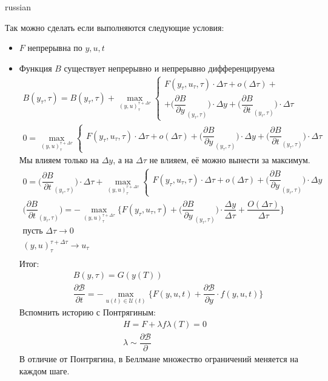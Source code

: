 \documentclass{article}
\begin{document}
\begin{otherlanguage*}{russian}
\begin{enumerate}
Так можно сделать если выполняются следующие условия:
\begin{itemize}
\item $ F $ непрерывна по $ y, u, t $  
\item Функция $ B $ существует непрерывно и непрерывно дифференцируема
\begin{align*}
B(y_\tau, \tau) = B(y_\tau, \tau) + \max_{(y, u)^{\tau + \Delta \tau}_{\tau}} \begin{cases} F(y_\tau, u_\tau, \tau) \cdot \Delta \tau + o(\Delta \tau) + \\ + \Big(\dfrac{\partial B}{\partial y}_{(y_\tau, \tau)}\Big) \cdot \Delta y + \Big(\dfrac{\partial B}{\partial t}_{(y_\tau, \tau)}\Big) \cdot \Delta \tau  \end{cases} \\
0 = \max_{(y, u)^{\tau + \Delta \tau}_{\tau}} \begin{cases} F(y_\tau, u_\tau, \tau) \cdot \Delta \tau + o(\Delta \tau) +  \Big(\dfrac{\partial B}{\partial y}_{(y_\tau, \tau)}\Big) \cdot \Delta y + \Big(\dfrac{\partial B}{\partial t}_{(y_\tau, \tau)}\Big) \cdot \Delta \tau  \end{cases}
\end{align*}
Мы влияем только на $ \Delta y$, а на $ \Delta \tau $ не влияем, её можно вынести за максимум. 
\begin{align*}
0 = \Big(\dfrac{\partial B}{\partial t}_{(y_\tau, \tau)}\Big) \cdot \Delta \tau + \max_{(y, u)^{\tau + \Delta \tau}_{\tau}} \begin{cases} F(y_\tau, u_\tau, \tau) \cdot \Delta \tau + o(\Delta \tau) +  \Big(\dfrac{\partial B}{\partial y}_{(y_\tau, \tau)}\Big) \cdot \Delta y \end{cases} \\
 \Big(\dfrac{\partial B}{\partial t}_{(y_\tau, \tau)}\Big) = - \max_{(y, u)^{\tau + \Delta \tau}_\tau} \{ F(y_\tau, u_\tau, \tau) + \Big(\dfrac{\partial B}{\partial y}_{(y_\tau, \tau)}\Big) \cdot \dfrac{\Delta y}{\Delta \tau}  + \dfrac{O(\Delta \tau)}{\Delta \tau} \} \\
\text{пусть } \Delta \tau \rightarrow 0 \\
(y, u)^{\tau + \Delta \tau}_\tau \rightarrow u_\tau \\
\end{align*}
Итог:
\begin{align*}
& B(y, \tau) = G(y(T)) \\
& \dfrac{\partial \mathcal{B}}{\partial t} = - \max_{u(t) \in \mathcal{U}(t)} \{ F(y, u, t) + \dfrac{\partial \mathcal{B}}{\partial y} \cdot f(y, u, t) \}
\end{align*}
Вспомнить историю с Понтрягиным:
\begin{align*}
H = F + \lambda f 
\lambda (T) = 0 \\
\lambda \sim \dfrac{\partial \mathcal{B}}{\partial }
\end{align*}
В отличие от Понтрягина, в Беллмане множество ограничений меняется на каждом шаге. 

\end{itemize}
\end{enumerate}
\end{otherlanguage*}
\end{document}
